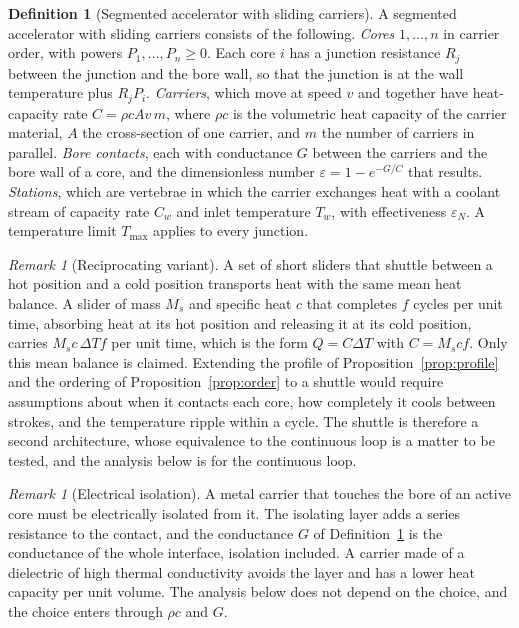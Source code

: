 \documentclass[11pt,openany]{book}
\theoremstyle{plain}
\theoremstyle{definition}
\newtheorem{definition}[theorem]{Definition}
\theoremstyle{remark}
\newtheorem{remark}[theorem]{Remark}
\begin{document}
\begin{definition}[Segmented accelerator with sliding carriers]\label{def:seg}
A segmented accelerator with sliding carriers consists of the following.
\emph{Cores} $1,\dots,n$ in carrier order, with powers $P_1,\dots,P_n\ge 0$. Each core $i$ has a junction resistance $R_j$ between the junction and the bore wall, so that the junction is at the wall temperature plus $R_jP_i$.
\emph{Carriers}, which move at speed $v$ and together have heat-capacity rate $C=\rho c A v\, m$, where $\rho c$ is the volumetric heat capacity of the carrier material, $A$ the cross-section of one carrier, and $m$ the number of carriers in parallel.
\emph{Bore contacts}, each with conductance $G$ between the carriers and the bore wall of a core, and the dimensionless number $\varepsilon=1-e^{-G/C}$ that results.
\emph{Stations}, which are vertebrae in which the carrier exchanges heat with a coolant stream of capacity rate $C_w$ and inlet temperature $T_w$, with effectiveness $\varepsilon_N$.
A temperature limit $T_{\max}$ applies to every junction.
\end{definition}

\begin{remark}[Reciprocating variant]
A set of short sliders that shuttle between a hot position and a cold position transports heat with the same mean heat balance. A slider of mass $M_s$ and specific heat $c$ that completes $f$ cycles per unit time, absorbing heat at its hot position and releasing it at its cold position, carries $M_s c\,\Delta T f$ per unit time, which is the form $Q=C\Delta T$ with $C=M_s c f$. Only this mean balance is claimed. Extending the profile of Proposition~\ref{prop:profile} and the ordering of Proposition~\ref{prop:order} to a shuttle would require assumptions about when it contacts each core, how completely it cools between strokes, and the temperature ripple within a cycle. The shuttle is therefore a second architecture, whose equivalence to the continuous loop is a matter to be tested, and the analysis below is for the continuous loop.
\end{remark}

\begin{remark}[Electrical isolation]
A metal carrier that touches the bore of an active core must be electrically isolated from it. The isolating layer adds a series resistance to the contact, and the conductance $G$ of Definition~\ref{def:seg} is the conductance of the whole interface, isolation included. A carrier made of a dielectric of high thermal conductivity avoids the layer and has a lower heat capacity per unit volume. The analysis below does not depend on the choice, and the choice enters through $\rho c$ and $G$.
\end{remark}
\end{document}

